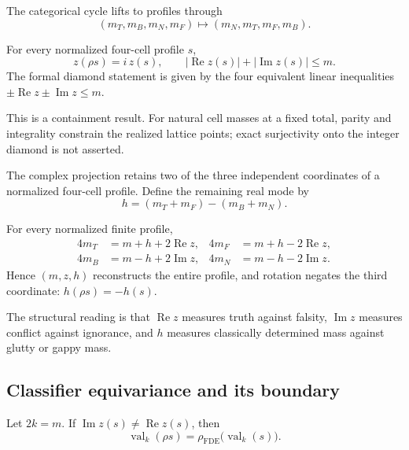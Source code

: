 The categorical cycle lifts to profiles through
\[
  (m_T,m_B,m_N,m_F)\longmapsto(m_N,m_T,m_F,m_B).
\]

\begin{theorem}
For every normalized four-cell profile \(s\),
\[
  z(\rho s)=i\,z(s),
  \qquad
  |\operatorname{Re}z(s)|+|\operatorname{Im}z(s)|\le m.
\]
The formal diamond statement is given by the four equivalent linear
inequalities \(\pm\operatorname{Re}z\pm\operatorname{Im}z\le m\).
\statusverified
\end{theorem}

This is a containment result. For natural cell masses at a fixed total, parity
and integrality constrain the realized lattice points; exact surjectivity onto
the integer diamond is not asserted.

The complex projection retains two of the three independent coordinates of a
normalized four-cell profile. Define the remaining real mode by
\[
  h=(m_T+m_F)-(m_B+m_N).
\]

\begin{theorem}
For every normalized finite profile,
\[
\begin{aligned}
  4m_T&=m+h+2\operatorname{Re}z,
  &4m_F&=m+h-2\operatorname{Re}z,\\
  4m_B&=m-h+2\operatorname{Im}z,
  &4m_N&=m-h-2\operatorname{Im}z.
\end{aligned}
\]
Hence \((m,z,h)\) reconstructs the entire profile, and rotation negates the
third coordinate: \(h(\rho s)=-h(s)\).
\statusverified
\end{theorem}

The structural reading is that \(\operatorname{Re}z\) measures truth against
falsity, \(\operatorname{Im}z\) measures conflict against ignorance, and
\(h\) measures classically determined mass against glutty or gappy mass.
\statusinterpretive

\subsection{Classifier equivariance and its boundary}

\begin{theorem}
Let \(2k=m\). If
\(\operatorname{Im}z(s)\neq\operatorname{Re}z(s)\), then
\[
  \operatorname{val}_k(\rho s)
    =\rho_{\mathrm{FDE}}\bigl(\operatorname{val}_k(s)\bigr).
\]
\statusverified
\end{theorem}

